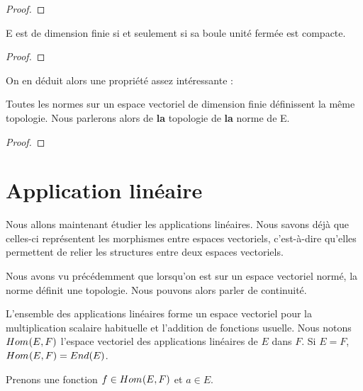 \ifdefined\outputproof
\begin{proof}

\end{proof}
\fi

\begin{theorem}
	\label{Riesz}
	E est de dimension finie si et seulement si sa boule unité fermée est compacte.
\end{theorem}

\ifdefined\outputproof
\begin{proof}

\end{proof}
\fi

On en déduit alors une propriété assez intéressante :

\begin{proposition}
	Toutes les normes sur un espace vectoriel de dimension finie définissent la
	même topologie. Nous parlerons alors de \textbf{la} topologie de \textbf{la} norme de E.
\end{proposition}

\ifdefined\outputproof
\begin{proof}

\end{proof}
\fi

\section{Application linéaire}

Nous allons maintenant étudier les applications linéaires. Nous savons déjà que
celles-ci représentent les morphismes entre espaces vectoriels, c'est-à-dire
qu'elles permettent de relier les structures entre deux espaces vectoriels.

Nous avons vu précédemment que lorsqu'on est sur un espace vectoriel normé, la
norme définit une topologie. Nous pouvons alors parler de continuité.

\begin{definition}
	L'ensemble des applications linéaires forme un espace vectoriel pour la
	multiplication scalaire habituelle et l'addition de fonctions usuelle.
	Nous notons $Hom_{}(E, F)$ l'espace vectoriel des applications
	linéaires de $E$ dans $F$. Si $E = F$, $Hom_{}(E, F) =
	End(E)$.
\end{definition}

Prenons une fonction $f \in Hom_{}(E, F)$ et $a \in E$.

